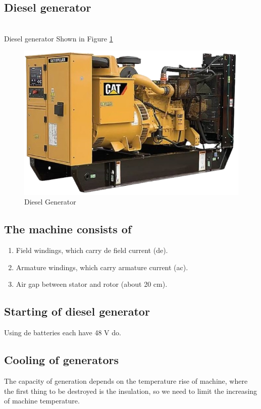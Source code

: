 \documentclass[12pt,fleqn]{book} %
\begin{document}
\subsection{Diesel generator}
\\ Diesel generator Shown in Figure \ref{fig:hamdy 14}
\begin{figure}[h!]
    \centering
    \includegraphics[width=0.8\linewidth]{hamdy 14.png}
    \caption{Diesel Generator}
    \label{fig:hamdy 14}
\end{figure} 
\subsection{The machine consists of}
\begin{enumerate}
    \item Field windings, which carry de field current (de).
    \item Armature windings, which carry armature current (ac).
    \item Air gap between stator and rotor (about 20 cm).
\end{enumerate}
\subsection{Starting of diesel generator}
Using de batteries each have 48 V do.
\subsection{Cooling of generators}
The capacity of generation depends on the temperature rise of machine, where the first thing to be destroyed is the insulation, so we need to limit the increasing of machine temperature.
\end{document}
